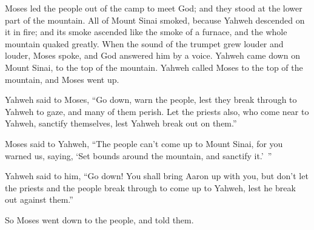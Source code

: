 {Moses led the people out of the camp to meet God; and they stood at the lower part of the mountain.
All of Mount Sinai smoked, because Yahweh descended on it in fire; and its smoke ascended like the smoke of a furnace, and the whole mountain quaked greatly.
When the sound of the trumpet grew louder and louder, Moses spoke, and God answered him by a voice.
Yahweh came down on Mount Sinai, to the top of the mountain. Yahweh called Moses to the top of the mountain, and Moses went up.
\par }{\PP {}Yahweh said to Moses, “Go down, warn the people, lest they break through to Yahweh to gaze, and many of them perish.
Let the priests also, who come near to Yahweh, sanctify themselves, lest Yahweh break out on them.”
\par }{\PP {}Moses said to Yahweh, “The people can’t come up to Mount Sinai, for you warned us, saying, ‘Set bounds around the mountain, and sanctify it.’ ”
\par }{\PP {}Yahweh said to him, “Go down! You shall bring Aaron up with you, but don’t let the priests and the people break through to come up to Yahweh, lest he break out against them.”
\par }{\PP {}So Moses went down to the people, and told them.

}
